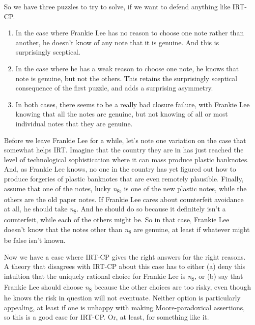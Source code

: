 \documentclass[
  11pt,
]{book}
\providecommand{\tightlist}{%
  \setlength{\itemsep}{0pt}\setlength{\parskip}{0pt}}
\begin{document}
So we have three puzzles to try to solve, if we want to defend anything like IRT-CP.

\begin{enumerate}
\def\labelenumi{\arabic{enumi}.}
\tightlist
\item
  In the case where Frankie Lee has no reason to choose one note rather than another, he doesn't know of any note that it is genuine. And this is surprisingly sceptical.
\item
  In the case where he has a weak reason to choose one note, he knows that note is genuine, but not the others. This retains the surprisingly sceptical consequence of the first puzzle, and adds a surprising asymmetry.
\item
  In both cases, there seems to be a really bad closure failure, with Frankie Lee knowing that all the notes are genuine, but not knowing of all or most individual notes that they are genuine.
\end{enumerate}

Before we leave Frankie Lee for a while, let's note one variation on the case that somewhat helps IRT. Imagine that the country they are in has just reached the level of technological sophistication where it can mass produce plastic banknotes. And, as Frankie Lee knows, no one in the country has yet figured out how to produce forgeries of plastic banknotes that are even remotely plausible. Finally, assume that one of the notes, lucky \emph{n}\textsubscript{8}, is one of the new plastic notes, while the others are the old paper notes. If Frankie Lee cares about counterfeit avoidance at all, he should take \emph{n}\textsubscript{8}. And he should do so because it definitely isn't a counterfeit, while each of the others might be. So in that case, Frankie Lee doesn't know that the notes other than \emph{n}\textsubscript{8} are genuine, at least if whatever might be false isn't known.

Now we have a case where IRT-CP gives the right answers for the right reasons. A theory that disagrees with IRT-CP about this case has to either (a) deny this intuition that the uniquely rational choice for Frankie Lee is \emph{n}\textsubscript{8}, or (b) say that Frankie Lee should choose \emph{n}\textsubscript{8} because the other choices are too risky, even though he knows the risk in question will not eventuate. Neither option is particularly appealing, at least if one is unhappy with making Moore-paradoxical assertions, so this is a good case for IRT-CP. Or, at least, for something like it.
\end{document}
